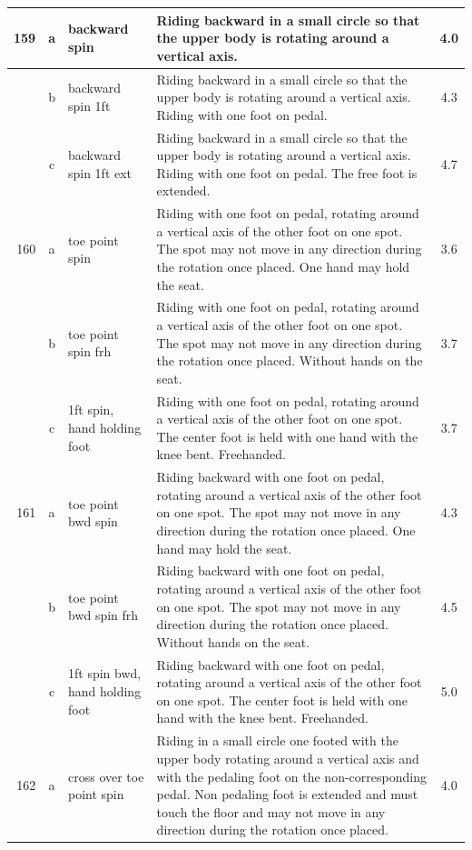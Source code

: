 \begin{longtable}{|r|c|p{4cm}|p{8cm}|c|}
\hline
159 & a & backward spin & Riding backward in a small circle so that the upper body is rotating around a vertical axis.  & 4.0 \\ 
\hline
  & b & backward spin 1ft & Riding backward in a small circle so that the upper body is rotating around a vertical axis. Riding with one foot on pedal. & 4.3 \\ 
\hline
  & c & backward spin 1ft ext & Riding backward in a small circle so that the upper body is rotating around a vertical axis. Riding with one foot on pedal. The free foot is extended.  & 4.7 \\ 
\hline
160 & a & toe point spin  & Riding with one foot on pedal, rotating around a vertical axis of the other foot on one spot. The spot may not move in any direction during the rotation once placed. One hand may hold the seat. & 3.6 \\ 
\hline
  & b & toe point spin frh  & Riding with one foot on pedal, rotating around a vertical axis of the other foot on one spot. The spot may not move in any direction during the rotation once placed. Without hands on the seat.  & 3.7 \\ 
\hline
  & c & 1ft spin, hand holding foot & Riding with one foot on pedal, rotating around a vertical axis of the other foot on one spot. The center foot is held with one hand with the knee bent. Freehanded. & 3.7 \\ 
\hline
161 & a & toe point bwd spin  & Riding backward with one foot on pedal, rotating around a vertical axis of the other foot on one spot. The spot may not move in any direction during the rotation once placed. One hand may hold the seat.  & 4.3 \\ 
\hline
  & b & toe point bwd spin frh  & Riding backward with one foot on pedal, rotating around a vertical axis of the other foot on one spot. The spot may not move in any direction during the rotation once placed. Without hands on the seat. & 4.5 \\ 
\hline
  & c & 1ft spin bwd, hand holding foot & Riding backward with one foot on pedal, rotating around a vertical axis of the other foot on one spot. The center foot is held with one hand with the knee bent. Freehanded.  & 5.0 \\ 
\hline
162 & a & cross over toe point spin & Riding in a small circle one footed with the upper body rotating around a vertical axis and with the pedaling foot on the non-corresponding pedal. Non pedaling foot is extended and must touch the floor and may not move in any direction during the rotation once placed.  & 4.0 \\ 

\end{longtable}
